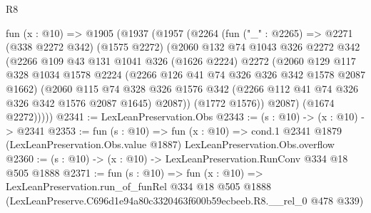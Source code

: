 \begin{lexlean}{R8}
\begin{coremodule}
  fun (x : @10) =>
  @1905
    (@1937
      (@1957
        (@2264
          (fun ("_" : @2265) =>
          @2271
            (@338 @2272 @342)
            (@1575 @2272)
            (@2060
              @132
              @74
              @1043
              @326
              @2272
              @342
              (@2266
                @109
                @43
                @131
                @1041
                @326
                (@1626 @2224)
                @2272
                (@2060
                  @129
                  @117
                  @328
                  @1034
                  @1578
                  @2224
                  (@2266 @126 @41 @74 @326 @326 @342 @1578 @2087 @1662)
                  (@2060
                    @115
                    @74
                    @328
                    @326
                    @1576
                    @342
                    (@2266 @112 @41 @74 @326 @326 @342 @1576 @2087 @1645)
                    @2087))
                (@1772 @1576))
              @2087)
            (@1674 @2272)))))
@2341 := LexLeanPreservation.Obs
@2343 := (s : @10) -> (x : @10) -> @2341
@2353 := fun (s : @10) =>
  fun (x : @10) =>
  cond.{1} @2341 @1879 (LexLeanPreservation.Obs.value @1887) LexLeanPreservation.Obs.overflow
@2360 := (s : @10) -> (x : @10) -> LexLeanPreservation.RunConv @334 @18 @505 @1888
@2371 := fun (s : @10) =>
  fun (x : @10) =>
  LexLeanPreservation.run_of_funRel
    @334
    @18
    @505
    @1888
    (LexLeanPreserve.C696d1e94a80c3320463f600b59ecbeeb.R8.__rel_0 @478 @339)
\end{coremodule}
\end{lexlean}
